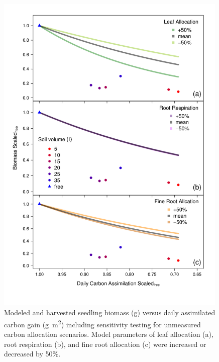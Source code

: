 \documentclass[a4paper]{article}\usepackage[]{graphicx}\usepackage[]{color}
\begin{document}
\begin{figure}[h!]
    \centering
    \includegraphics[width=0.99\textwidth]{gc_Day_scenario.pdf}
    \caption{Modeled and harvested seedling biomass (g) versus daily assimilated carbon gain (g~m\textsuperscript{2}) including sensitivity testing for unmeasured carbon allocation scenarios.  Model parameters of leaf allocation (a), root respiration (b), and fine root allocation (c) were increased or decreased by 50$\%$.}
    \label{fig:figureSI1}
\end{figure}
\end{document}
